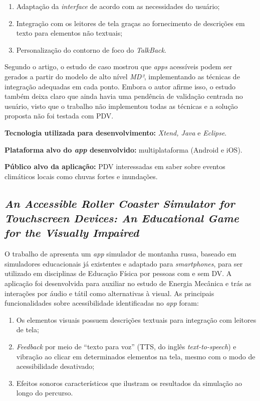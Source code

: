 \begin{enumerate}
    \item Adaptação da \emph{interface} de acordo com as necessidades do usuário;
    \item Integração com os leitores de tela graças ao fornecimento de descrições em texto para elementos não textuais;
    \item Personalização do contorno de foco do \emph{TalkBack}.
\end{enumerate}

Segundo o artigo, o estudo de caso mostrou que \emph{apps} acessíveis podem ser gerados a partir do modelo de alto nível \emph{MD²}, implementando as técnicas de integração adequadas em
cada ponto. Embora o autor afirme isso, o estudo também deixa claro que ainda havia uma pendência de validação centrada no usuário, visto que o trabalho não implementou todas as técnicas
e a solução proposta não foi testada com PDV\@.

\textbf{Tecnologia utilizada para desenvolvimento:} \emph{Xtend, Java} e \emph{Eclipse}.

\textbf{Plataforma alvo do \emph{app} desenvolvido:} multiplataforma (Android e iOS).

\textbf{Público alvo da aplicação:} PDV interessadas em saber sobre eventos climáticos locais como chuvas fortes e inundações.

\subsection{\emph{An Accessible Roller Coaster Simulator for Touchscreen Devices: An Educational Game for the Visually Impaired}}

O trabalho de  apresenta um \emph{app} simulador de montanha russa, baseado em simuladores educacionais já existentes
e adaptado para \emph{smartphones}, para ser utilizado em disciplinas de Educação Física por pessoas com e sem DV\@.
A aplicação foi desenvolvida para auxiliar no estudo de Energia Mecânica e trás as interações por áudio e tátil como alternativas à visual.
As principais funcionalidades sobre acessibilidade identificadas no \emph{app} foram:

\begin{enumerate}
    \item Os elementos visuais possuem descrições textuais para integração com leitores de tela;
    \item \emph{Feedback} por meio de ``texto para voz'' (TTS, do inglês \emph{text-to-speech}) e vibração ao clicar em determinados elementos
          na tela, mesmo com o modo de acessibilidade desativado;
    \item Efeitos sonoros característicos que ilustram os resultados da simulação ao longo do percurso.
\end{enumerate}

